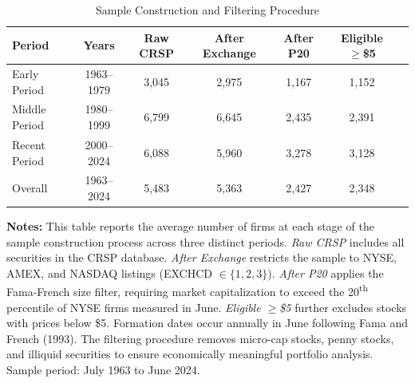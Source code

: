 \begin{table}[htbp]
\centering
\caption{Sample Construction and Filtering Procedure}
\label{tab:data_overview}
\begin{tabular}{lcccccc}
\toprule
\textbf{Period} & \textbf{Years} & \textbf{Raw CRSP} & \textbf{After Exchange} & \textbf{After P20} & \textbf{Eligible $\geq$\$5} \\
\midrule
Early Period & 1963–1979 & 3,045 & 2,975 & 1,167 & 1,152 \\
Middle Period & 1980–1999 & 6,799 & 6,645 & 2,435 & 2,391 \\
Recent Period & 2000–2024 & 6,088 & 5,960 & 3,278 & 3,128 \\
Overall & 1963–2024 & 5,483 & 5,363 & 2,427 & 2,348 \\
\bottomrule
\end{tabular}

\medskip

\begin{minipage}{\textwidth}
\small
\textbf{Notes:} This table reports the average number of firms at each stage of the sample construction process across three distinct periods. \textit{Raw CRSP} includes all securities in the CRSP database. \textit{After Exchange} restricts the sample to NYSE, AMEX, and NASDAQ listings (EXCHCD $\in \{1,2,3\}$). \textit{After P20} applies the Fama-French size filter, requiring market capitalization to exceed the 20\textsuperscript{th} percentile of NYSE firms measured in June. \textit{Eligible $\geq$\$5} further excludes stocks with prices below \$5. Formation dates occur annually in June following Fama and French (1993). The filtering procedure removes micro-cap stocks, penny stocks, and illiquid securities to ensure economically meaningful portfolio analysis. Sample period: July 1963 to June 2024.
\end{minipage}

\end{table}
